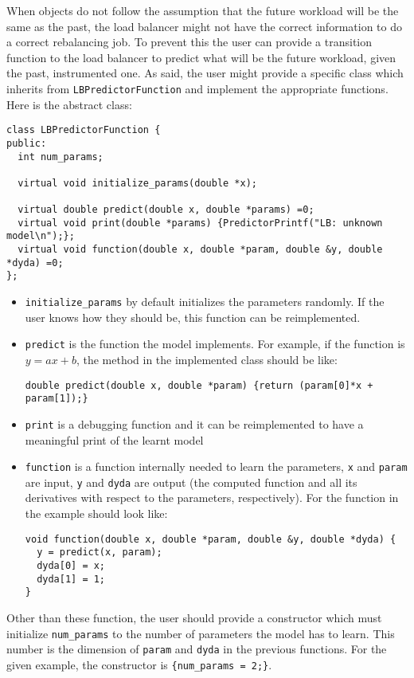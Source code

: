 When objects do not follow the assumption that the future workload will be the
same as the past, the load balancer might not have the correct information to do
a correct rebalancing job. To prevent this the user can provide a transition
function to the load balancer to predict what will be the future workload, given
the past, instrumented one. As said, the user might provide a specific class
which inherits from {\tt LBPredictorFunction} and implement the appropriate functions. 
Here is the abstract class:
\begin{verbatim}
class LBPredictorFunction {
public:
  int num_params;
 
  virtual void initialize_params(double *x);

  virtual double predict(double x, double *params) =0;
  virtual void print(double *params) {PredictorPrintf("LB: unknown model\n");};
  virtual void function(double x, double *param, double &y, double *dyda) =0;
};
\end{verbatim}
\begin{itemize}
\item {\tt initialize\_params} by default initializes the parameters randomly. If the user
knows how they should be, this function can be reimplemented.
\item {\tt predict} is the function the model implements. For example, if the function is
$y=ax+b$, the method in the implemented class should be like:
\begin{verbatim}
double predict(double x, double *param) {return (param[0]*x + param[1]);}
\end{verbatim}
\item {\tt print} is a debugging function and it can be reimplemented to have a meaningful
print of the learnt model
\item {\tt function} is a function internally needed to learn the parameters, {\tt x} and
{\tt param} are input, {\tt y} and {\tt dyda} are output (the computed function and
all its derivatives with respect to the parameters, respectively).
For the function in the example should look like:
\begin{verbatim}
void function(double x, double *param, double &y, double *dyda) {
  y = predict(x, param);
  dyda[0] = x;
  dyda[1] = 1;
}
\end{verbatim}
\end{itemize}
Other than these function, the user should provide a constructor which must initialize
{\tt num\_params} to the number of parameters the model has to learn. This number is
the dimension of {\tt param} and {\tt dyda} in the previous functions. For the given
example, the constructor is {\tt \{num\_params = 2;\}}.

